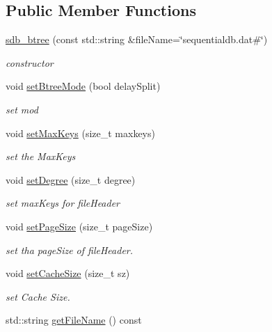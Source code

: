 \subsection*{Public Member Functions}
\begin{CompactItemize}
\item 
\hyperlink{classsdb__btree_ae55c86e49f1ff7c02f4251ccfe8c625}{sdb\_\-btree} (const std::string \&fileName=\char`\"{}sequentialdb.dat\#\char`\"{})
\begin{CompactList}\small\item\em constructor \item\end{CompactList}\item 
void \hyperlink{classsdb__btree_1f6eb93d26b290d3969de6503672ae07}{setBtreeMode} (bool delaySplit)
\begin{CompactList}\small\item\em set mod \item\end{CompactList}\item 
void \hyperlink{classsdb__btree_c393399c9c8b9a1f06ecb4f4cce15bf0}{setMaxKeys} (size\_\-t maxkeys)
\begin{CompactList}\small\item\em set the MaxKeys \item\end{CompactList}\item 
void \hyperlink{classsdb__btree_fc9d66b5f80ba33b114c5f4db70a8dc6}{setDegree} (size\_\-t degree)
\begin{CompactList}\small\item\em set maxKeys for fileHeader \item\end{CompactList}\item 
void \hyperlink{classsdb__btree_930cde276bf7ed268a7005ba92dfbf12}{setPageSize} (size\_\-t pageSize)
\begin{CompactList}\small\item\em set tha pageSize of fileHeader. \item\end{CompactList}\item 
void \hyperlink{classsdb__btree_a815f13cd8a7cf18a93190e6aa9c4efc}{setCacheSize} (size\_\-t sz)
\begin{CompactList}\small\item\em set Cache Size. \item\end{CompactList}\item 
\hypertarget{classsdb__btree_85f5043da06823365665619cda9eebb2}{
std::string \hyperlink{classsdb__btree_85f5043da06823365665619cda9eebb2}{getFileName} () const }
\label{classsdb__btree_85f5043da06823365665619cda9eebb2}


\end{CompactItemize}

